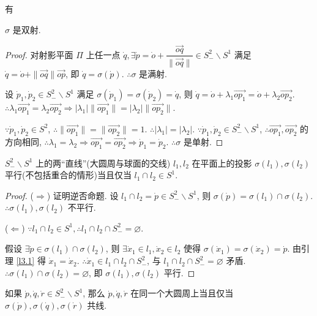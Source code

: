 \documentclass[color=black,device=normal,lang=cn,mode=geye]{elegantnote}
\begin{document}
有
\begin{lemma}\label{l3.1}
    $\sigma$ 是双射.
\end{lemma}
\begin{proof}
    对射影平面 $\varPi$ 上任一点 $\dot{q},\exists\dot{p}=\dot{o}+\dfrac{\overrightarrow{oq}}{\|\overrightarrow{oq}\|}\in S^2_-\backslash S^1$ 满足 $\dot{q}=\dot{o}+\|\overrightarrow{oq}\|\overrightarrow{op}$, 即 $\dot{q}=\sigma(\dot{p})$. $\therefore\sigma$ 是满射.
    
    设 $\dot{p}_1,\dot{p}_2\in S^2_-\backslash S^1$ 满足 $\sigma(\dot{p}_1)=\sigma(\dot{p}_2)=\dot{q}$, 则 $\dot{q}=\dot{o}+\lambda_1\overrightarrow{op_1}=\dot{o}+\lambda_2\overrightarrow{op_2}$. $\therefore\lambda_1\overrightarrow{op_1}=\lambda_2\overrightarrow{op_2}\Rightarrow|\lambda_1|\|\overrightarrow{op_1}\|=|\lambda_2|\|\overrightarrow{op_2}\|$.
    
    $\because\dot{p}_1,\dot{p}_2\in S^2$, $\therefore\|\overrightarrow{op_1}\|=\|\overrightarrow{op_2}\|=1$. $\therefore|\lambda_1|=|\lambda_2|$. $\because\dot{p}_1,\dot{p}_2\in S^2_-\backslash S^1$, $\therefore\overrightarrow{op_1},\overrightarrow{op_2}$ 的方向相同, $\therefore\lambda_1=\lambda_2\Rightarrow\overrightarrow{op_1}=\overrightarrow{op_2}\Rightarrow\dot{p}_1=\dot{p}_2$. $\therefore\sigma$ 是单射.
\end{proof}
\begin{theorem}
    $S^2_-\backslash S^1$ 上的两``直线''(大圆周与球面的交线) $l_1,l_2$ 在平面上的投影 $\sigma(l_1),\sigma(l_2)$ 平行(不包括重合的情形)当且仅当 $l_1\cap l_2\in S^1$.
\end{theorem}
\begin{proof}
    ($\Rightarrow$) 证明逆否命题. 设 $l_1\cap l_2=\dot{p}\in S^2_-\backslash S^1$, 则 $\sigma(\dot{p})=\sigma(l_1)\cap\sigma(l_2)$. $\therefore\sigma(l_1),\sigma(l_2)$ 不平行.
    
    ($\Leftarrow$) $\because l_1\cap l_2\in S^1,\therefore l_1\cap l_2\cap S^2_-=\varnothing$.

    假设 $\exists\dot{p}\in\sigma(l_1)\cap\sigma(l_2)$, 则 $\exists\dot{x}_1\in l_1,\dot{x}_2\in l_2$ 使得 $\sigma(\dot{x}_1)=\sigma(\dot{x}_2)=\dot{p}$. 由引理 \ref{l3.1} 得 $\dot{x}_1=\dot{x}_2$. $\therefore\dot{x}_1\in l_1\cap l_2\cap S^2_-$, 与 $l_1\cap l_2\cap S^2_-=\varnothing$ 矛盾. $\therefore\sigma(l_1)\cap\sigma(l_2)=\varnothing$, 即 $\sigma(l_1),\sigma(l_2)$ 平行.
\end{proof}
\begin{theorem}
    如果 $\dot{p},\dot{q},\dot{r}\in S^2_-\backslash S^1$, 那么 $\dot{p},\dot{q},\dot{r}$ 在同一个大圆周上当且仅当 $\sigma(\dot{p}),\sigma(\dot{q}),\sigma(\dot{r})$ 共线.
\end{theorem}
\end{document}

